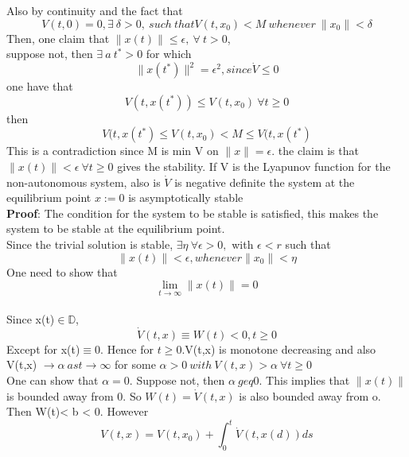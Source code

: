 \documentclass[a4paper,12pt]{report}
\numberwithin{equation}{section}
\begin{document}
Also by continuity and the fact that 
\begin{equation*}
 V(t,0)=0,\exists \ \delta > 0, \ such \ that V(t,x_{0})<M  \ whenever \ \|x_{0}\|<\delta
\end{equation*}  
Then, one claim that $\|x(t)\|\leq \epsilon, \ \forall \ t>0 $, \\
suppose not, then $\exists \ a \  t^{*}>0$ for which
\begin{equation*}
\|x(t^*)\|^{2}=\epsilon^{2}, since \dot{V}\leq 0
\end{equation*} 
one have that
\begin{equation*}
V(t,x(t^{*}))\leq V(t,x_{0}) \ \forall t \geq 0
\end{equation*}
then
\begin{equation*}
V(t,x(t^{*})\leq V(t,x_{0})< M \leq V(t,x(t^{*})
\end{equation*}
This is a contradiction since M is min V on $\|x\|=\epsilon$. the claim is that $\|x(t)\|<\epsilon \ \forall t\geq 0$ gives the stability.
\theorem If V is the Lyapunov function for the non-autonomous system, also is $\dot{V} $ is negative definite the system at the equilibrium point $x:=0 $ is asymptotically stable \\
\textbf{Proof}: The condition for the system to be stable is satisfied, this makes the system to be stable at the equilibrium point.\\
Since the trivial solution is stable, $\exists \eta \ \forall \epsilon >0,$ with $\epsilon<r$ such that 
\begin{equation*}
\|x(t)\|<\epsilon, whenever \|x_{0}\|<\eta
\end{equation*} 
One need to show that $$\displaystyle{\lim_{t \to \infty}}\|x(t)\|=0 $$\\
Since x(t)$\in \mathbb{D}$,
\begin{equation*}
\dot{V}(t,x)\equiv W(t)<0, t \geq 0
\end{equation*}
Except for x(t)$\equiv 0$. Hence for $t\geq0$.V(t,x) is monotone decreasing and also V(t,x) $\to \alpha \ as t \to \infty$ for some $\alpha >0 \ with \ V(t,x)>\alpha\ \forall t\geq 0 $\\
One can show that $\alpha=0$. Suppose not, then $\alpha \ geq 0 $. This implies that $\|x(t)\|$ is bounded away from 0. So $W(t)=\dot{V}(t,x)$ is also bounded away from o. Then W(t)< b < 0.
However 
\begin{equation*}
V(t,x)= V(t,x_{0})+ \displaystyle{\int_{0}^{t} \dot{V}(t,x(d))ds}
\end{equation*}
\end{document}
